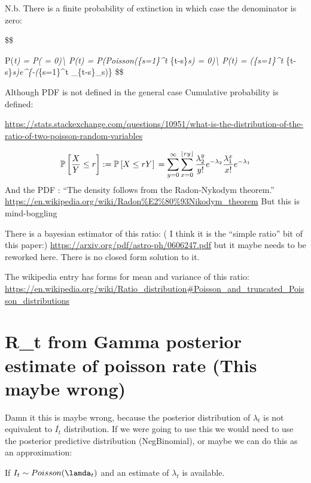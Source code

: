 \documentclass[
]{article}
\begin{document}
N.b. There is a finite probability of extinction in which case the
denominator is zero:

\$\$

P(\emph{t) = P( =
0)\textbackslash{} P(\emph{t) =
P(Poisson(\sum}\{s=1\}\^{}t \lambda}\{t-s\}\omega\emph{s) =
0)\textbackslash{} P(\emph{t) = \Big(\sum}\{s=1\}\^{}t
\lambda}\{t-s\}\omega\emph{s\Big)e\^{}\{-\Big(\sum}\{s=1\}\^{}t
\lambda\_\{t-s\}\omega\_s\Big)\} \$\$

Although PDF is not defined in the general case Cumulative probability
is defined:

\url{https://stats.stackexchange.com/questions/10951/what-is-the-distribution-of-the-ratio-of-two-poisson-random-variables}

\[
\mathbb{P}\left[\frac{X}{Y} \leq r \right] := \mathbb{P}\left[X \leq r Y\right]\\
= \sum_{y = 0}^\infty \sum_{x=0}^{\left\lfloor ry \right\rfloor} \frac{\lambda_{2}^y }{y!}e^{-\lambda_2} \frac{\lambda_{1}^x }{x!}e^{-\lambda_1}
\] And the PDF : ``The density follows from the Radon-Nykodym theorem.''
\url{https://en.wikipedia.org/wiki/Radon\%E2\%80\%93Nikodym_theorem} But
this is mind-boggling

There is a bayesian estimator of this ratio: ( I think it is the
``simple ratio'' bit of this paper:)
\url{https://arxiv.org/pdf/astro-ph/0606247.pdf} but it maybe needs to
be reworked here. There is no closed form solution to it.

The wikipedia entry has forms for mean and variance of this ratio:
\url{https://en.wikipedia.org/wiki/Ratio_distribution\#Poisson_and_truncated_Poisson_distributions}

\hypertarget{r_t-from-gamma-posterior-estimate-of-poisson-rate-this-maybe-wrong}{%
\section{R\_t from Gamma posterior estimate of poisson rate (This maybe
wrong)}\label{r_t-from-gamma-posterior-estimate-of-poisson-rate-this-maybe-wrong}}

Damn it this is maybe wrong, because the posterior distribution of
\(\lambda_t\) is not equivalent to \(\overline{I_t}\) distribution. If
we were going to use this we would need to use the posterior predictive
distribution (NegBinomial), or maybe we can do this as an approximation:

If \(I_t \sim Poisson(\lamda_t)\) and an estimate of \(\lambda_t\) is
available.
\end{document}
